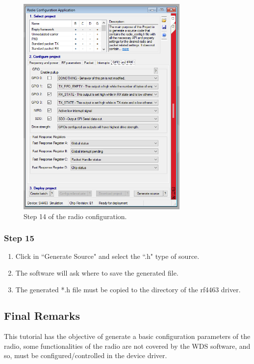 \begin{figure}[!h]
	\begin{center}
		\includegraphics[width=0.75\textwidth]{figures/wds-tutorial-14.png}
		\caption{Step 14 of the radio configuration.}
		\label{fig:wds-tutorial-step-14}
	\end{center}
\end{figure}

\subsubsection{Step 15}

\begin{enumerate}
    \item Click in ``Generate Source" and select the ``.h" type of source.
    \item The software will ask where to save the generated file.
    \item The generated *.h file must be copied to the directory of the rf4463 driver.
\end{enumerate}

\subsection{Final Remarks}

This tutorial has the objective of generate a basic configuration parameters of the radio, some functionalities of the radio are not covered by the WDS software, and so, must be configured/controlled in the device driver.


